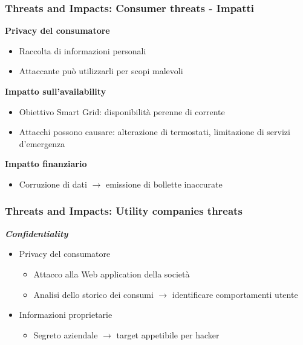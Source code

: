 \begin{frame}
  \frametitle{Threats and Impacts: Consumer threats - Impatti}
	\textbf{Privacy del consumatore}
		\begin{itemize}
		\item Raccolta di informazioni personali
		\item Attaccante può utilizzarli per scopi malevoli
		\end{itemize}
		\pause
	\textbf{Impatto sull'availability}
			\begin{itemize} 
		\item Obiettivo Smart Grid: disponibilità perenne di corrente
		\item Attacchi possono causare: alterazione di termostati, limitazione di servizi d'emergenza
		\end{itemize}
		\pause
	\textbf{Impatto finanziario}
				\begin{itemize}
		\item Corruzione di dati $\rightarrow$ emissione di bollette inaccurate
		\end{itemize}
\end{frame}

\begin{frame}
  \frametitle{Threats and Impacts: Utility companies threats}
 \textbf{\textit{Confidentiality}}
  \begin{itemize}[<+- | alert@+>]
	  \item Privacy del consumatore
	  \begin{itemize}
	  \item Attacco alla Web application della società 
	  \item Analisi dello storico dei consumi $\rightarrow$ identificare comportamenti utente
	  \end{itemize}
	\item Informazioni proprietarie
		\begin{itemize}
		\item Segreto aziendale $\rightarrow$ target appetibile per hacker
		\end{itemize}
 	\end{itemize}
\end{frame}

